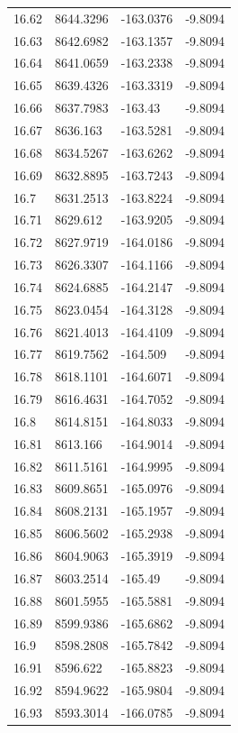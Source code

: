\begin{table}[H]
\begin{tabular}{llll}
16.62 & 8644.3296 & -163.0376 & -9.8094 \\
16.63 & 8642.6982 & -163.1357 & -9.8094 \\
16.64 & 8641.0659 & -163.2338 & -9.8094 \\
16.65 & 8639.4326 & -163.3319 & -9.8094 \\
16.66 & 8637.7983 & -163.43 & -9.8094 \\
16.67 & 8636.163 & -163.5281 & -9.8094 \\
16.68 & 8634.5267 & -163.6262 & -9.8094 \\
16.69 & 8632.8895 & -163.7243 & -9.8094 \\
16.7 & 8631.2513 & -163.8224 & -9.8094 \\
16.71 & 8629.612 & -163.9205 & -9.8094 \\
16.72 & 8627.9719 & -164.0186 & -9.8094 \\
16.73 & 8626.3307 & -164.1166 & -9.8094 \\
16.74 & 8624.6885 & -164.2147 & -9.8094 \\
16.75 & 8623.0454 & -164.3128 & -9.8094 \\
16.76 & 8621.4013 & -164.4109 & -9.8094 \\
16.77 & 8619.7562 & -164.509 & -9.8094 \\
16.78 & 8618.1101 & -164.6071 & -9.8094 \\
16.79 & 8616.4631 & -164.7052 & -9.8094 \\
16.8 & 8614.8151 & -164.8033 & -9.8094 \\
16.81 & 8613.166 & -164.9014 & -9.8094 \\
16.82 & 8611.5161 & -164.9995 & -9.8094 \\
16.83 & 8609.8651 & -165.0976 & -9.8094 \\
16.84 & 8608.2131 & -165.1957 & -9.8094 \\
16.85 & 8606.5602 & -165.2938 & -9.8094 \\
16.86 & 8604.9063 & -165.3919 & -9.8094 \\
16.87 & 8603.2514 & -165.49 & -9.8094 \\
16.88 & 8601.5955 & -165.5881 & -9.8094 \\
16.89 & 8599.9386 & -165.6862 & -9.8094 \\
16.9 & 8598.2808 & -165.7842 & -9.8094 \\
16.91 & 8596.622 & -165.8823 & -9.8094 \\
16.92 & 8594.9622 & -165.9804 & -9.8094 \\
16.93 & 8593.3014 & -166.0785 & -9.8094 \\

\end{tabular}
\end{table}
